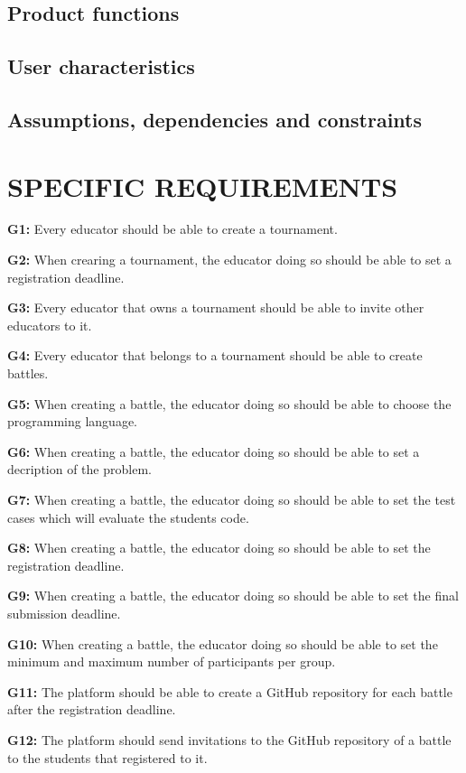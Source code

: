 \documentclass{article}
\begin{document}
\subsection{Product functions}
\subsection{User characteristics}
\subsection{Assumptions, dependencies and constraints}

\section{SPECIFIC REQUIREMENTS}
\iffalse
    \item \textbf{G1:} Every educator should be able to create a tournament.
    \item \textbf{G2:} When crearing a tournament, the educator doing so should be able to set a registration deadline.
    \item \textbf{G3:} Every educator that owns a tournament should be able to invite other educators to it.
    \item \textbf{G4:} Every educator that belongs to a tournament should be able to create battles.
    \item \textbf{G5:} When creating a battle, the educator doing so should be able to choose the programming language.
    \item \textbf{G6:} When creating a battle, the educator doing so should be able to set a decription of the problem.
    \item \textbf{G7:} When creating a battle, the educator doing so should be able to set the test cases which will evaluate the students code.
    \item \textbf{G8:} When creating a battle, the educator doing so should be able to set the registration deadline.
    \item \textbf{G9:} When creating a battle, the educator doing so should be able to set the final submission deadline.
    \item \textbf{G10:} When creating a battle, the educator doing so should be able to set the minimum and maximum number of participants per group.
    \item \textbf{G11:} The platform should be able to create a GitHub repository for each battle after the registration deadline.
    \item \textbf{G12:} The platform should send invitations to the GitHub repository of a battle to the students that registered to it.
\end{document}
